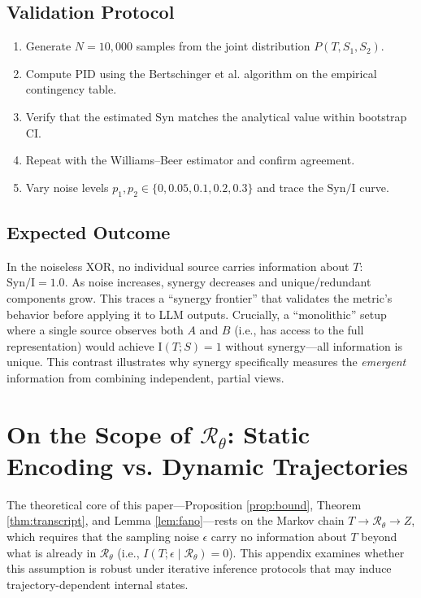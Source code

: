 \documentclass[11pt,a4paper]{article}
\theoremstyle{remark}
\newcommand{\Syn}{\mathrm{Syn}}
\newcommand{\MI}{\mathrm{I}}
\begin{document}
\subsection{Validation Protocol}

\begin{enumerate}
  \item Generate $N = 10{,}000$ samples from the joint distribution $P(T, S_1, S_2)$.
  \item Compute PID using the Bertschinger et al. algorithm on the empirical contingency table.
  \item Verify that the estimated $\Syn$ matches the analytical value within bootstrap CI.
  \item Repeat with the Williams--Beer estimator and confirm agreement.
  \item Vary noise levels $p_1, p_2 \in \{0, 0.05, 0.1, 0.2, 0.3\}$ and trace the $\Syn / \MI$ curve.
\end{enumerate}

\subsection{Expected Outcome}

In the noiseless XOR, no individual source carries information about $T$: $\Syn / \MI = 1.0$. As noise increases, synergy decreases and unique/redundant components grow. This traces a ``synergy frontier'' that validates the metric's behavior before applying it to LLM outputs. Crucially, a ``monolithic'' setup where a single source observes both $A$ and $B$ (i.e., has access to the full representation) would achieve $\MI(T; S) = 1$ without synergy---all information is unique. This contrast illustrates why synergy specifically measures the \emph{emergent} information from combining independent, partial views.

\section{On the Scope of $\mathcal{R}_\theta$: Static Encoding vs. Dynamic Trajectories}
\label{sec:dynamic}

The theoretical core of this paper---Proposition \ref{prop:bound}, Theorem \ref{thm:transcript}, and Lemma \ref{lem:fano}---rests on the Markov chain $T \to \mathcal{R}_\theta \to Z$, which requires that the sampling noise $\epsilon$ carry no information about $T$ beyond what is already in $\mathcal{R}_\theta$ (i.e., $I(T; \epsilon \mid \mathcal{R}_\theta) = 0$). This appendix examines whether this assumption is robust under iterative inference protocols that may induce trajectory-dependent internal states.
\end{document}
